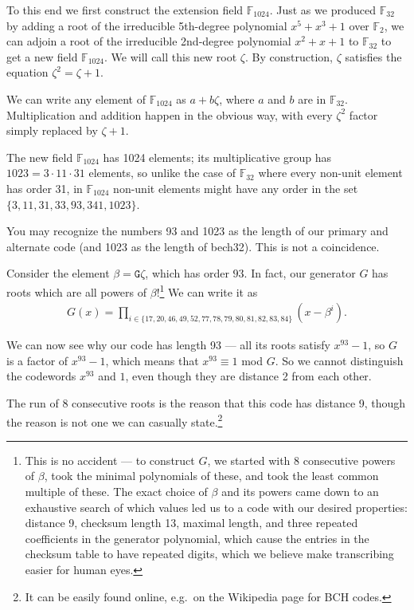 \documentclass[letterpaper]{article}
\newcommand{\ftwo}{\mathbb{F}_2}
\newcommand{\fttwo}{\mathbb{F}_{32}}
\newcommand{\ftttwo}{\mathbb{F}_{1024}}
\newcommand{\vc}[1]{\texttt{#1}} %
\begin{document}
To this end we first construct the extension field $\ftttwo$. Just as we
produced $\fttwo$ by adding a root of the irreducible 5th-degree polynomial
$x^5 + x^3 + 1$ over $\ftwo$, we can adjoin a root of the irreducible
2nd-degree polynomial $x^2 + x + 1$ to $\fttwo$ to get a new field $\ftttwo$.
We will call this new root $\zeta$. By construction, $\zeta$ satisfies
the equation $\zeta^2 = \zeta + 1$.

We can write any element of $\ftttwo$ as $a + b\zeta$, where $a$ and $b$ are
in $\fttwo$. Multiplication and addition happen in the obvious way, with
every $\zeta^2$ factor simply replaced by $\zeta + 1$.

The new field $\ftttwo$ has 1024 elements; its multiplicative group has
$1023 = 3\cdot11\cdot31$ elements, so unlike the case of $\fttwo$ where every
non-unit element has order 31, in $\ftttwo$ non-unit elements might have any
order in the set $\{3, 11, 31, 33, 93, 341, 1023\}$.

You may recognize the numbers 93 and 1023 as the length of our primary and
alternate code (and 1023 as the length of bech32). This is not a coincidence.

Consider the element $\beta = \vc{G}\zeta$, which has order $93$. In fact, our
generator $G$ has roots which are all powers of $\beta$!\footnote{This is no
accident --- to construct $G$, we started with 8 consecutive powers of $\beta$,
took the minimal polynomials of these, and took the least common multiple of
these. The exact choice of $\beta$ and its powers came down to an exhaustive
search of which values led us to a code with our desired properties: distance
9, checksum length 13, maximal length, and three repeated coefficients in the
generator polynomial, which cause the entries in the checksum table to have
repeated digits, which we believe make transcribing easier for human eyes.}
We can write it as
\begin{align*}
    G(x) = \prod_{i\in\{17, 20, 46, 49, 52, 77, 78, 79, 80, 81, 82, 83, 84\}} (x - \beta^i).
\end{align*}

We can now see why our code has length 93 --- all its roots satisfy $x^{93}-1$,
so $G$ is a factor of $x^{93}-1$, which means that $x^{93}\equiv1$ mod $G$. So
we cannot distinguish the codewords $x^{93}$ and $1$, even though they are
distance 2 from each other.

The run of 8 consecutive roots is the reason that this code has distance 9, though
the reason is not one we can casually state.\footnote{It can be easily
found online, e.g.~on the Wikipedia page for BCH codes.}
\end{document}
